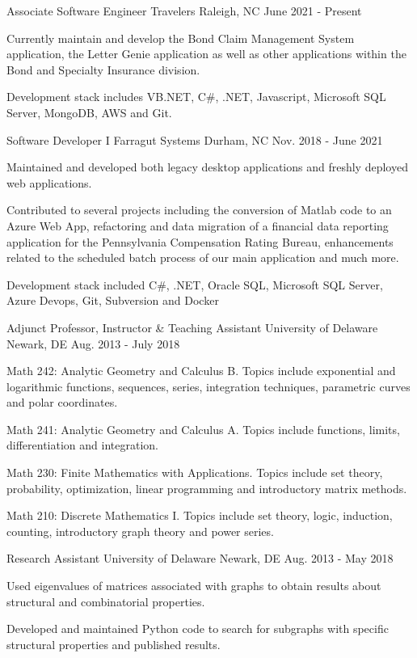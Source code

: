 \begin{cventries}
  \cventry
    {Associate Software Engineer}
    {Travelers}
    {Raleigh, NC}
    {June 2021 - Present}
    {
      \begin{cvitems}
        \item {Currently maintain and develop the Bond Claim Management System application, the Letter Genie application as well as other applications within the Bond and Specialty Insurance division.}
        \item {Development stack includes VB.NET, C\#, .NET, Javascript, Microsoft SQL Server, MongoDB, AWS and Git.}
      \end{cvitems}
    }
  \cventry
    {Software Developer I}
    {Farragut Systems}
    {Durham, NC}
    {Nov. 2018 - June 2021}
    {
      \begin{cvitems}
        \item {Maintained and developed both legacy desktop applications and freshly deployed web applications.}
        \item {Contributed to several projects including the conversion of Matlab code to an Azure Web App, refactoring and data migration of a financial data reporting application for the Pennsylvania Compensation Rating Bureau, enhancements
         related to the scheduled batch process of our main application and much more.}
        \item {Development stack included C\#, .NET, Oracle SQL, Microsoft SQL Server, Azure Devops, Git, Subversion and Docker}
      \end{cvitems}
    }
  \cventry
    {Adjunct Professor, Instructor \& Teaching Assistant}
    {University of Delaware}
    {Newark, DE}
    {Aug. 2013 - July 2018}
    {
      \begin{cvitems}
        \item {Math 242: Analytic Geometry and Calculus B. Topics include exponential and logarithmic functions, sequences, series, integration techniques, parametric curves and polar coordinates.}
        \item {Math 241: Analytic Geometry and Calculus A. Topics include functions, limits, differentiation and integration.}
        \item {Math 230: Finite Mathematics with Applications. Topics include set theory, probability, optimization, linear programming and introductory matrix methods.}
        \item {Math 210: Discrete Mathematics I. Topics include set theory, logic, induction, counting, introductory graph theory and power series.}
      \end{cvitems}
    }
  \cventry
    {Research Assistant}
    {University of Delaware}
    {Newark, DE}
    {Aug. 2013 - May 2018}
    {
      \begin{cvitems}
        \item {Used eigenvalues of matrices associated with graphs to obtain results about structural and combinatorial properties.}
        \item{Developed and maintained Python code to search for subgraphs with specific structural properties and published results.}
      \end{cvitems}
    }
\end{cventries}
\vspace*{-4pt}
